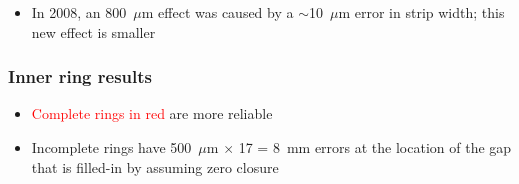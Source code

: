 \documentclass[compress]{beamer}
\begin{document}
\begin{frame}
\begin{itemize}
\item In 2008, an 800~$\mu$m effect was caused by a
  $\sim$10~$\mu$m error in strip width; this new effect is smaller
\end{itemize}
\end{frame}

\begin{frame}
\frametitle{Inner ring results}


\vspace{-0.25 cm}
\begin{itemize}
\item \textcolor{red}{Complete rings in red} are more reliable
\item Incomplete rings have 500~$\mu$m $\times$ 17 = 8~mm errors at the location of the gap that is filled-in by assuming zero closure
\end{itemize}
\end{frame}
\end{document}
